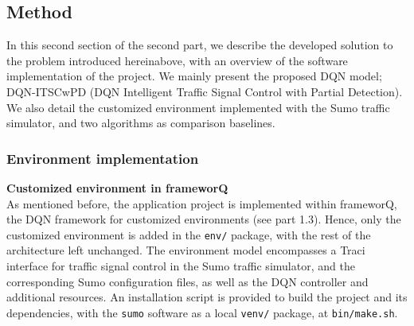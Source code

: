 \subsection{Method}

In this second section of the second part, we describe the developed solution to the problem introduced hereinabove, with an overview of the software implementation of the project.
We mainly present the proposed DQN model; DQN-ITSCwPD (DQN Intelligent Traffic Signal Control with Partial Detection). We also detail the customized environment implemented with the Sumo traffic simulator, and two  algorithms as comparison baselines. 

\subsubsection{Environment implementation}

\textbf{Customized environment in frameworQ} \\
As mentioned before, the application project is implemented within frameworQ, the DQN framework for customized environments (see part 1.3). Hence, only the customized environment is added in the \texttt{env/} package, with the rest of the architecture left unchanged. The environment model encompasses a Traci interface for traffic signal control in the Sumo traffic simulator, and the corresponding Sumo configuration files, as well as the DQN controller and additional resources. An installation script is provided to build the project and its dependencies, with the \texttt{sumo} software as a local \texttt{venv/} package, at \texttt{bin/make.sh}. \\

